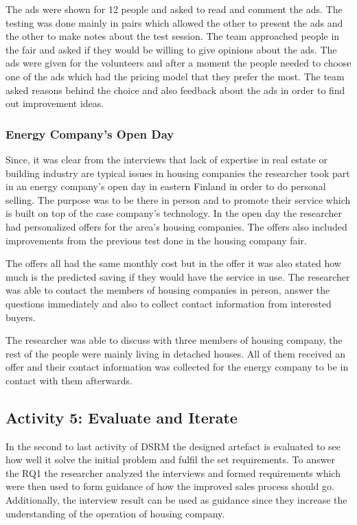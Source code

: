 The ads were shown for 12 people and asked to read and comment the ads. The testing was done mainly in pairs which allowed the other to present the ads and the other to make notes about the test session. The team approached people in the fair and asked if they would be willing to give opinions about the ads. The ads were given for the volunteers and after a moment the people needed to choose one of the ads which had the pricing model that they prefer the most. The team asked reasons behind the choice and also feedback about the ads in order to find out improvement ideas.

\subsubsection*{Energy Company's Open Day}

Since, it was clear from the interviews that lack of expertise in real estate or building industry are typical issues in housing companies the researcher took part in an energy company's open day in eastern Finland in order to do personal selling. The purpose was to be there in person and to promote their service which is built on top of the case company's technology. In the open day the researcher had personalized offers for the area's housing companies.  The offers also included improvements from the previous test done in the housing company fair.

The offers all had the same monthly cost but in the offer it was also stated how much is the predicted saving if they would have the service in use. The researcher was able to contact the members of housing companies in person, answer the questions immediately and also to collect contact information from interested buyers.

The researcher was able to discuss with three members of housing company, the rest of the people were mainly living in detached houses. All of them received an offer and their contact information was collected for the energy company to be in contact with them afterwards.

\subsection{Activity 5: Evaluate and Iterate}

In the second to last activity of DSRM the designed artefact is evaluated to see how well it solve the initial problem and fulfil the set requirements. To answer the RQ1 the researcher analyzed the interviews and formed requirements which were then used to form guidance of how the improved sales process should go. Additionally, the interview result can be used as guidance since they increase the understanding of the operation of housing company.

